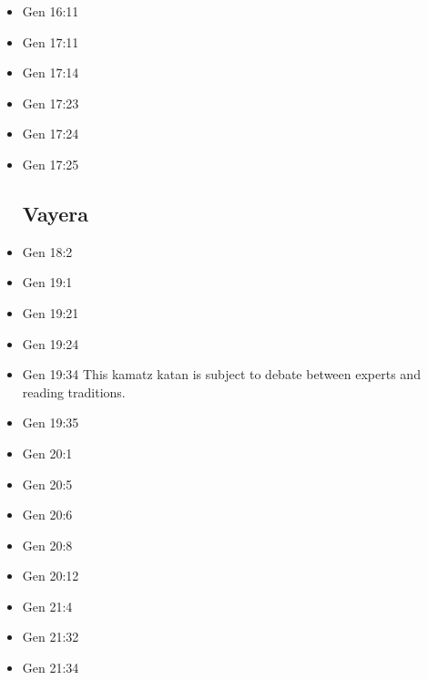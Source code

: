 \documentclass[14pt]{book}
\begin{document}
\begin{multicols}{2}
\begin{itemize}
\item Gen 16:11

\item Gen 17:11

\item Gen 17:14

\item Gen 17:23

\item Gen 17:24

\item Gen 17:25

\subsection{Vayera}

\item Gen 18:2

\item Gen 19:1

\item Gen 19:21

\item Gen 19:24

\item Gen 19:34 This kamatz katan is subject to debate between experts and reading traditions.

\item Gen 19:35

\item Gen 20:1

\item Gen 20:5

\item Gen 20:6

\item Gen 20:8

\item Gen 20:12

\item Gen 21:4

\item Gen 21:32

\item Gen 21:34


\end{itemize}
\end{multicols}
\end{document}
